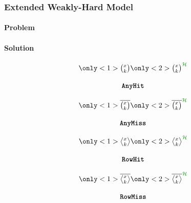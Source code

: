 \begin{frame}
    \frametitle{Extended Weakly-Hard Model}
    \framesubtitle<1>{Problem}%
    \framesubtitle<2>{Solution}%
    \begin{minipage}[c]{0.23\textwidth}
        \centering
        \begin{equation*}
            \begin{matrix}
                \only<1>{\Large \anyhit{}}%
                \only<2>{\Large \anyhit{}^{\textcolor{lqgcolour}{\strat}}}\\
                            \\
                \tAH{}
            \end{matrix}
        \end{equation*}\newline
    \end{minipage}\hfill
    \begin{minipage}[c]{0.23\textwidth}
        \centering
        \begin{equation*}
            \begin{matrix}
                \only<1>{\Large \anymiss{}}%
                \only<2>{\Large \anymiss{}^{\textcolor{lqgcolour}{\strat}}}\\
                            \\
                \tAM{}
            \end{matrix}
        \end{equation*}\newline
    \end{minipage}\hfill
    \begin{minipage}[c]{0.23\textwidth}
        \centering
        \begin{equation*}
            \begin{matrix}
                \only<1>{\Large \rowhit{}}%
                \only<2>{\Large \rowhit{}^{\textcolor{lqgcolour}{\strat}}}\\
                            \\
                \tRH{}
            \end{matrix}
        \end{equation*}\newline
    \end{minipage}\hfill
    \begin{minipage}[c]{0.23\textwidth}
        \centering
        \begin{equation*}
            \begin{matrix}
                \only<1>{\Large \rowmiss{}}%
                \only<2>{\Large \rowmiss{}^{\textcolor{lqgcolour}{\strat}}}\\
                            \\
                \tRM{}
            \end{matrix}
        \end{equation*}\newline
    \end{minipage}

    \centering
\end{frame}


